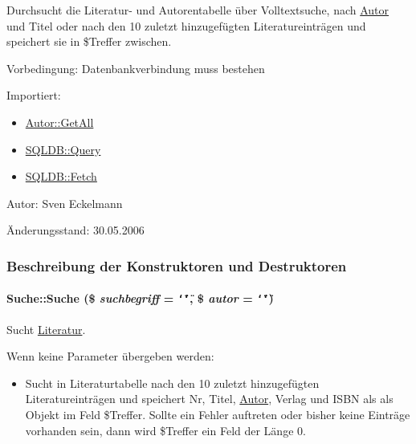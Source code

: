Durchsucht die Literatur- und Autorentabelle über Volltextsuche, nach \hyperlink{classAutor}{Autor} und Titel oder nach den 10 zuletzt hinzugefügten Literatureinträgen und speichert sie in \$Treffer zwischen. \begin{Desc}
\item[Vorbedingung:]Datenbankverbindung muss bestehen \end{Desc}
\begin{Desc}
\item[Importiert:]\begin{itemize}
\item \hyperlink{classAutor_79cd90084cab240919a5daecf39156a7}{Autor::Get\-All}\item \hyperlink{classSQLDB_fc6ffa8df50f68f07d9f5e3385b96d7a}{SQLDB::Query}\item \hyperlink{classSQLDB_a55c00ce1de0e50e0a58cae61892ba35}{SQLDB::Fetch}\end{itemize}
\end{Desc}
\begin{Desc}
\item[Autor:]Sven Eckelmann \end{Desc}
\begin{Desc}
\item[Änderungsstand:]30.05.2006 \end{Desc}




\subsubsection{Beschreibung der Konstruktoren und Destruktoren}
\hypertarget{classSuche_277cd59d3689d6f0875d114be0024935}{
\paragraph[Suche]{\setlength{\rightskip}{0pt plus 5cm}Suche::Suche (\$ {\em suchbegriff} = {\tt \char`\"{}\char`\"{}}, \$ {\em autor} = {\tt \char`\"{}\char`\"{}})}\hfill}
\label{classSuche_277cd59d3689d6f0875d114be0024935}


Sucht \hyperlink{classLiteratur}{Literatur}. 

Wenn keine Parameter übergeben werden:\begin{itemize}
\item Sucht in Literaturtabelle nach den 10 zuletzt hinzugefügten Literatureinträgen und speichert Nr, Titel, \hyperlink{classAutor}{Autor}, Verlag und ISBN als als Objekt im Feld \$Treffer. Sollte ein Fehler auftreten oder bisher keine Einträge vorhanden sein, dann wird \$Treffer ein Feld der Länge 0.\end{itemize}


